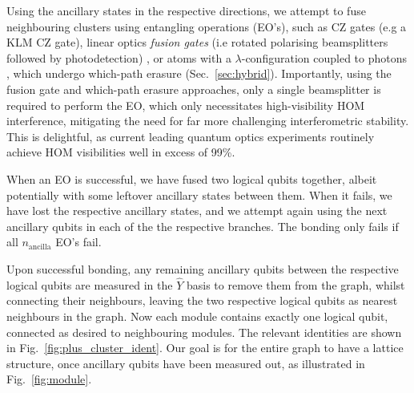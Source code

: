 \documentclass[aps,rmp,twocolumn,amsmath,amssymb,nofootinbib,superscriptaddress,longbibliography,floatfix]{revtex4-1}
\begin{document}
Using the ancillary states in the respective directions, we attempt to fuse neighbouring clusters using entangling operations (EO's), such as CZ gates (e.g a KLM CZ gate), linear optics \emph{fusion gates} (i.e rotated polarising beamsplitters followed by photodetection) \cite{bib:BrowneRudolph05}, or atoms with a $\lambda$-configuration coupled to photons \cite{bib:BarrettKok05}, which undergo which-path erasure (Sec.~\ref{sec:hybrid}). Importantly, using the fusion gate and which-path erasure approaches, only a single beamsplitter is required to perform the EO, which only necessitates high-visibility HOM \cite{HOM} interference, mitigating the need for far more challenging interferometric stability. This is delightful, as current leading quantum optics experiments routinely achieve HOM visibilities well in excess of 99\%.

When an EO is successful, we have fused two logical qubits together, albeit potentially with some leftover ancillary states between them. When it fails, we have lost the respective ancillary states, and we attempt again using the next ancillary qubits in each of the the respective branches. The bonding only fails if all $n_\mathrm{ancilla}$ EO's fail.

Upon successful bonding, any remaining ancillary qubits between the respective logical qubits are measured in the $\hat{Y}$ basis to remove them from the graph, whilst connecting their neighbours, leaving the two respective logical qubits as nearest neighbours in the graph. Now each module contains exactly one logical qubit, connected as desired to neighbouring modules. The relevant identities are shown in Fig.~\ref{fig:plus_cluster_ident}. Our goal is for the entire graph to have a lattice structure, once ancillary qubits have been measured out, as illustrated in Fig.~\ref{fig:module}.
\end{document}

